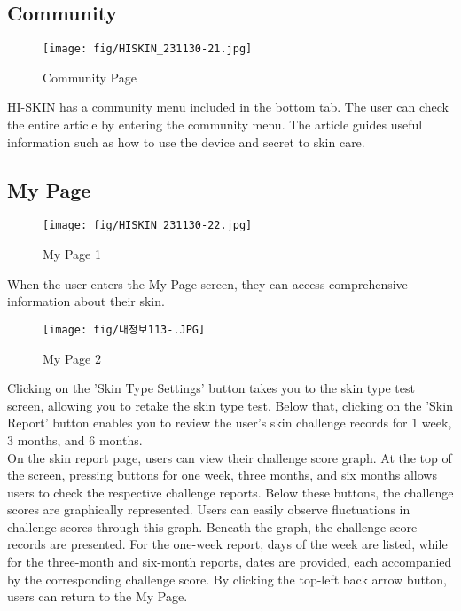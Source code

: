 \documentclass[conference]{IEEEtran}
\begin{document}
\subsection{Community} 
    \begin{figure}[h]
    \centering
    \texttt{[image: fig/HISKIN\_231130-21.jpg]}
    \label{fig:Community Page}
    \caption{Community Page} 
    \end{figure}
HI-SKIN has a community menu included in the bottom tab. The user can check the entire article by entering the community menu. The article guides useful information such as how to use the device and secret to skin care.


\subsection{My Page}
    \begin{figure}[h]
    \centering
    \texttt{[image: fig/HISKIN\_231130-22.jpg]}
    \label{fig:My Page 1}
    \caption{My Page 1} 
    \end{figure}
When the user enters the My Page screen, they can access comprehensive information about their skin. \\

\begin{figure}[h]
    \centering
    \texttt{[image: fig/내정보113-.JPG]}
    \label{fig:My Page 2}
    \caption{My Page 2} 
    \end{figure}
    Clicking on the 'Skin Type Settings' button takes you to the skin type test screen, allowing you to retake the skin type test. Below that, clicking on the 'Skin Report' button enables you to review the user's skin challenge records for 1 week, 3 months, and 6 months.\\
    On the skin report page, users can view their challenge score graph. At the top of the screen, pressing buttons for one week, three months, and six months allows users to check the respective challenge reports. Below these buttons, the challenge scores are graphically represented. Users can easily observe fluctuations in challenge scores through this graph. Beneath the graph, the challenge score records are presented. For the one-week report, days of the week are listed, while for the three-month and six-month reports, dates are provided, each accompanied by the corresponding challenge score. By clicking the top-left back arrow button, users can return to the My Page.\\ \\
\end{document}
